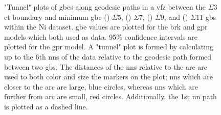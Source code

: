 \documentclass[final,twocolumn,12pt]{elsarticle}
\begin{document}
\begin{figure}[!htb]
\begin{subfigure}[b]{0.4\textwidth}
			\caption{}
			\label{fig:tunnel-3-11-olmsted}
		\end{subfigure}
		\caption{"Tunnel" plots of \glspl{gbe} along geodesic paths in a \gls{vfz} between the $\Sigma3$ \gls{ct} boundary and minimum \gls{gbe} () $\Sigma5$, () $\Sigma7$, () $\Sigma9$, and () $\Sigma11$ \glspl{gb} within the Ni \citet{olmstedSurveyComputedGrain2009a} dataset. \Gls{gbe} values are plotted for the \gls{brk} and \gls{gpr} models which both used \citet{olmstedSurveyComputedGrain2009a} as \inpt{} data. 95\% confidence intervals are plotted for the \gls{gpr} model. A "tunnel" plot is formed by calculating up to the 6th \glspl{nn} of the \inpt{} data relative to the geodesic path formed between two \glspl{gb}. The distances of the \glspl{nn} relative to the arc are used to both color and size the markers on the plot; \glspl{nn} which are closer to the arc are large, blue circles, whereas \glspl{nn} which are further from arc are small, red circles. Additionally, the 1st \gls{nn} path is plotted as a dashed line.}
		\label{fig:sigma-tunnels-olmsted}
	\end{figure}
	
\end{document}
